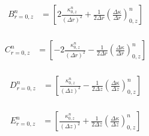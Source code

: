 \documentclass[12pt]{article}
\begin{document}
		\begin{equation}
      \begin{aligned}
        B^n_{r=0, z} &= \left [2\frac{\kappa^n_{0, z}}{(\Delta r)^2} + \frac{1}{2\Delta r}(\frac{\Delta\kappa}{\Delta r})^n_{0, z} \right ] \\
      \end{aligned}
		\end{equation}
		
		\begin{equation}
      \begin{aligned}
        C^n_{r=0, z} &= \left [-2\frac{\kappa^n_{0, z}}{(\Delta r)^2} - \frac{1}{2\Delta r}(\frac{\Delta\kappa}{\Delta r})^n_{0, z} \right ] \\
      \end{aligned}
		\end{equation}

		\begin{equation}
      \begin{aligned}
        D^n_{r=0, z} &= \left [\frac{\kappa^n_{0, z}}{(\Delta z)^2} - \frac{1}{2\Delta z}(\frac{\Delta\kappa}{\Delta z})^n_{0, z}  \right ] \\
      \end{aligned}
		\end{equation}
		
		\begin{equation}
      \begin{aligned}
        E^n_{r=0, z} &= \left [ \frac{\kappa^n_{0, z}}{(\Delta z)^2} + \frac{1}{2\Delta z}(\frac{\Delta\kappa}{\Delta z})^n_{0, z} \right ] \\
      \end{aligned}
		\end{equation}
\end{document}
